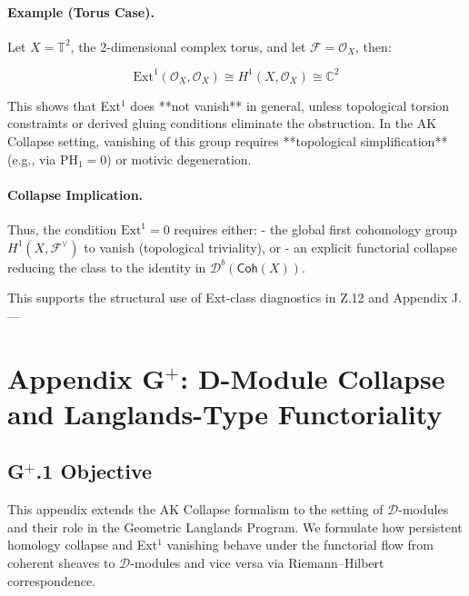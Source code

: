 \documentclass[11pt]{article}
\begin{document}
\vspace{1em}
\paragraph{Example (Torus Case).}

Let \( X = \mathbb{T}^2 \), the 2-dimensional complex torus, and let \( \mathcal{F} = \mathcal{O}_X \), then:

\[
\mathrm{Ext}^1(\mathcal{O}_X, \mathcal{O}_X) \cong H^1(X, \mathcal{O}_X) \cong \mathbb{C}^2
\]

This shows that Ext$^1$ does **not vanish** in general, unless topological torsion constraints or derived gluing conditions eliminate the obstruction.  
In the AK Collapse setting, vanishing of this group requires **topological simplification** (e.g., via PH$_1 = 0$) or motivic degeneration.

\vspace{1em}
\paragraph{Collapse Implication.}  
Thus, the condition \( \mathrm{Ext}^1 = 0 \) requires either:
- the global first cohomology group \( H^1(X, \mathcal{F}^\vee) \) to vanish (topological triviality), or
- an explicit functorial collapse reducing the class to the identity in \( \mathcal{D}^b(\mathsf{Coh}(X)) \).

This supports the structural use of Ext-class diagnostics in Z.12 and Appendix J.
---



\section*{Appendix G$^+$: D-Module Collapse and Langlands-Type Functoriality}

\subsection*{G$^+$.1 Objective}

This appendix extends the AK Collapse formalism to the setting of $\mathcal{D}$-modules and their role in the Geometric Langlands Program.  
We formulate how persistent homology collapse and Ext$^1$ vanishing behave under the functorial flow from coherent sheaves to $\mathcal{D}$-modules  
and vice versa via Riemann–Hilbert correspondence.
\end{document}

